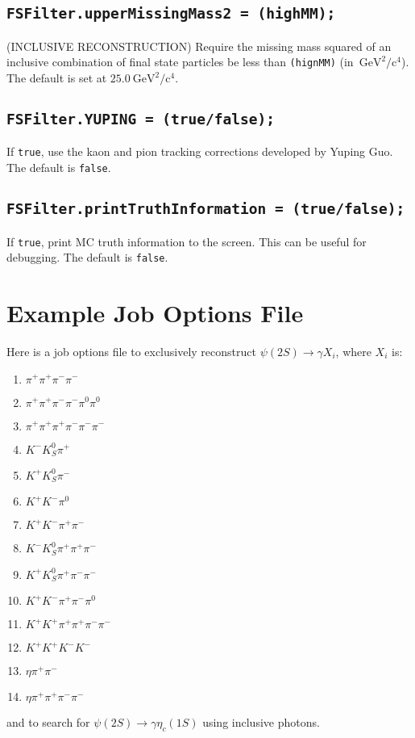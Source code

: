 \documentclass[11pt]{article}
\newcommand{\gevccgevcc}{\mathrm{GeV^2/c^4}}
\begin{document}
\subsection{\tt FSFilter.upperMissingMass2 = (highMM);}

(INCLUSIVE RECONSTRUCTION) Require the missing mass squared of an inclusive combination of final state particles be less than {\tt (hignMM)} (in~$\gevccgevcc$).  The default is set at $25.0~\gevccgevcc$.

\subsection{\tt FSFilter.YUPING = (true/false);}

If {\tt true}, use the kaon and pion tracking corrections developed by Yuping Guo.  The default is {\tt false}.

\subsection{\tt FSFilter.printTruthInformation = (true/false);}

If {\tt true}, print MC truth information to the screen.  This can be useful for debugging.  The default is {\tt false}.


\section{Example Job Options File}
\label{sec:example}

Here is a job options file to exclusively reconstruct $\psi(2S)\to\gamma X_i$, where $X_i$ is:
\begin{enumerate}
\item{$\pi^+\pi^+\pi^-\pi^-$}
\item{$\pi^+\pi^+\pi^-\pi^-\pi^0\pi^0$}
\item{$\pi^+\pi^+\pi^+\pi^-\pi^-\pi^-$}
\item{$K^-K^0_S\pi^+$}
\item{$K^+K^0_S\pi^-$}
\item{$K^+K^-\pi^0$}
\item{$K^+K^-\pi^+\pi^-$}
\item{$K^-K^0_S\pi^+\pi^+\pi^-$}
\item{$K^+K^0_S\pi^+\pi^-\pi^-$}
\item{$K^+K^-\pi^+\pi^-\pi^0$}
\item{$K^+K^+\pi^+\pi^+\pi^-\pi^-$}
\item{$K^+K^+K^-K^-$}
\item{$\eta\pi^+\pi^-$}
\item{$\eta\pi^+\pi^+\pi^-\pi^-$}
\end{enumerate}
and to search for $\psi(2S)\to\gamma\eta_c(1S)$ using inclusive photons.
\end{document}
